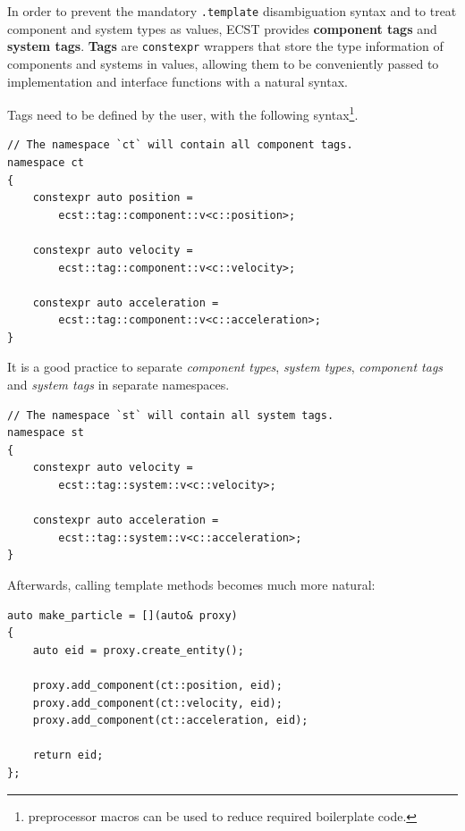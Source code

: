 \documentclass[twoside, 12pt, a4paper, openright]{book}
\begin{document}
In order to prevent the mandatory
\texttt{.template}
disambiguation syntax and to treat component and system types as values,
ECST provides \textbf{component tags} and \textbf{system tags}.
\textbf{Tags} are
\texttt{constexpr}
wrappers that store the type information of components and systems in
values, allowing them to be conveniently passed to implementation and
interface functions with a natural syntax.

Tags need to be defined by the user, with the following syntax\footnote{preprocessor
  macros can be used to reduce required boilerplate code.}.

\begin{verbatim}
// The namespace `ct` will contain all component tags.
namespace ct
{
    constexpr auto position =
        ecst::tag::component::v<c::position>;

    constexpr auto velocity =
        ecst::tag::component::v<c::velocity>;

    constexpr auto acceleration =
        ecst::tag::component::v<c::acceleration>;
}
\end{verbatim}

It is a good practice to separate \emph{component types}, \emph{system
types}, \emph{component tags} and \emph{system tags} in separate
namespaces.

\begin{verbatim}
// The namespace `st` will contain all system tags.
namespace st
{
    constexpr auto velocity =
        ecst::tag::system::v<c::velocity>;

    constexpr auto acceleration =
        ecst::tag::system::v<c::acceleration>;
}
\end{verbatim}

Afterwards, calling template methods becomes much more natural:

\begin{verbatim}
auto make_particle = [](auto& proxy)
{
    auto eid = proxy.create_entity();

    proxy.add_component(ct::position, eid);
    proxy.add_component(ct::velocity, eid);
    proxy.add_component(ct::acceleration, eid);

    return eid;
};
\end{verbatim}
\end{document}
